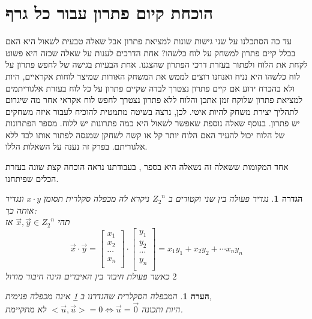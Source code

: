 \documentclass[12pt,leqno]{article}
\newtheorem{definition}{הגדרה}[section]
\newtheorem{comm}{הערה}[section]
\newcommand{\Zn}{{Z_2}^n}
\begin{document}
\section{הוכחת  קיום פתרון עבור כל גרף}
עד כה הסתכלנו על שני גישות שונות למציאת פתרון
אבל שאלה טבעית לשאול היא האם בכלל קיים פתרון למשחק על לוח כלשהו?
אחת הדרכים לענות על שאלה שכזה היא פשוט לקחת את הלוח ולפתור בעזרת 
דרכי הפתרון שהצגנו.
אחת הבעיות בגישה של לחפש פתרון על לוח כלשהו היא 
נניח ואנחנו רוצים לממש את המשחק האורות שמיצר לוחות אקראיים, היות ולא בהכרח ידוע אם קיים פתרון 
נצטרך לבדה שקיים פתרון על כל לוח בעזרת אלגוריתמים למציאת פתרון שלוקח זמן 
אתכן והלוח ללא פתרון נצטרך לחפש לוח אקראי אחר
מה שיגרום לתהליך יצירת משחק להיות איטי.
לכן, נרצה בשיטה מתמטית להוכיח לעבור איזה משחקים יש פתרון.
בנוסף שאלה נוספת שאפשר לשאול היא כמה פתרונות יש ללוח.
מספר הפתרונות של הלוח יכול להעיד האם הלוח יותר קל או קשה לשחקן שמנסה לפתור אותו
לבד ללא אלגוריתם.
בפרק זה נענה על השאלות הללו.

אחד המקומות ששאלה זה נשאלה היא בספר 
\cite{B3},
בעבודתנו נראה הוכחה קצת שונה בעזרת הכלים שפיתחנו.

\begin{definition}
    \label{def:inner_mul}
    נגדיר פעולה 
    בין שני וקטורים ב
    $\Zn$
    ניקרא לה מכפלה סקלרית
    תסומן 
    $x \cdot y$
    ונגדיר אותה כך:
    \\
    תהי 
    $\vec{x}, \vec{y} \in \Zn$
    אז 
    \[
        \vec{x} \cdot \vec{y} = 
        \begin{bmatrix}
            x_1 \\
            x_2 \\
            \cdots \\
            x_n \\
        \end{bmatrix}
        \cdot 
        \begin{bmatrix}
            y_1 \\
            y_2 \\
            \cdots \\
            y_n \\
        \end{bmatrix}
        = 
        x_1 y_1 + x_2 y_2 + \cdots x_n y_n
    \]
    כאשר 
    פעולת חיבור בין האיברים 
    הינה 
    חיבור מודול
    $2$
\end{definition}

\begin{comm}
    \label{comm:not_really_inner_mul}
    המכפלה הסקלרית שהגדרנו ב
    \ref{def:inner_mul}
    אינה מכפלה פנימית,
    \\
    היות ותכונה 
    $<\vec{u},\vec{u}> = 0 \Leftrightarrow \vec{u} = \vec{0} $
    לא מתקיימת.
\end{comm}
\end{document}
